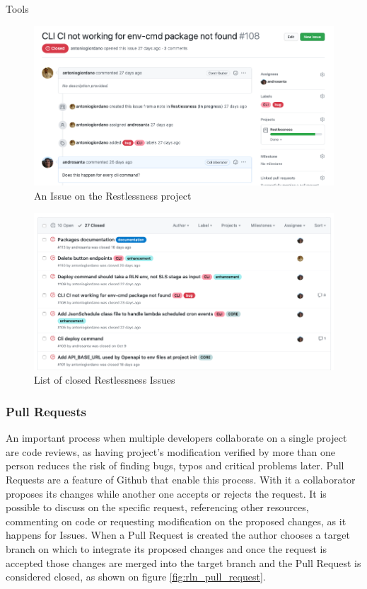 \begin{chapter}{Tools}
    \begin{figure}
        \centering
        \includegraphics[width=\linewidth]{source/images/github-rln-issue.png}
        \caption{An Issue on the Restlessness project}
        \label{fig:rln_issue}
    \end{figure}

    \begin{figure}
        \centering
        \includegraphics[width=\linewidth]{source/images/github-rln-issues-list.png}
        \caption{List of closed Restlessness Issues}
        \label{fig:rln_issues_list}
    \end{figure}

    \subsubsection{Pull Requests}
    An important process when multiple developers collaborate on a single project
    are code reviews, as having project's modification verified by more than one
    person reduces the risk of finding bugs, typos and critical problems later.
    Pull Requests are a feature of Github that enable this process. With it a
    collaborator proposes its changes while another one accepts or rejects the request.
    It is possible to discuss on the specific request, referencing other resources,
    commenting on code or requesting modification on the proposed changes, as it
    happens for Issues.
    When a Pull Request is created the author chooses a target branch on which to
    integrate its proposed changes and once the request is accepted those changes
    are merged into the target branch and the Pull Request is considered closed,
    as shown on figure \ref{fig:rln_pull_request}.


\end{chapter}
